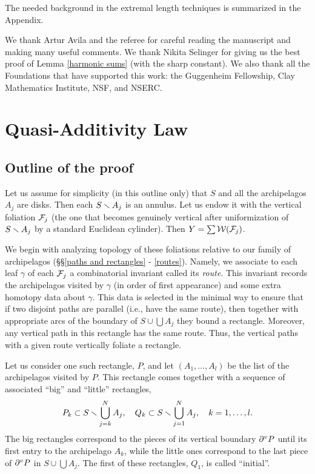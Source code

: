The needed background in the extremal length techniques is summarized in 
the Appendix.   



 We thank Artur Avila and the referee for careful reading the manuscript and making many useful comments.
We  thank Nikita Selinger for giving us the best proof of Lemma \ref{harmonic sums}
(with the sharp constant).
We also thank all the Foundations that have supported this work: 
the Guggenheim Fellowship, Clay Mathematics Institute, NSF, and NSERC. 

\section{Quasi-Additivity Law}\label{quasi-add}


\subsection{Outline of the proof}

   Let us assume for simplicity (in this outline only) that $S$ and all the archipelagos
$A_j$  are  disks. Then each $S\smallsetminus A_j$ is an  annulus. Let us endow it with the vertical foliation
${\cal F}_j$ (the one that becomes genuinely vertical after uniformization of $S\smallsetminus A_j$ by a standard Euclidean
cylinder). Then $Y=\sum {\cal W}({\cal F}_j)$. 

We begin  with analyzing topology of these foliations relative to our
family of archipelagos (\S\S \ref{paths and rectangles} - \ref{routes}). 
Namely, we associate to each leaf $\gamma$ of each ${\cal F}_j$ a combinatorial invariant called its {\it route}. 
This invariant records the archipelagos visited by $\gamma$ (in order of first appearance) 
and some extra homotopy data
about $\gamma$. This data is selected in the minimal way 
to ensure that if two disjoint paths are   parallel (i.e., have the same route), then together
with appropriate arcs of the boundary of $ S\cup \bigcup A_j$ they bound a rectangle.
Moreover, any vertical path in this rectangle has the same route.
Thus, the vertical paths  with a given route vertically foliate a rectangle.

Let us consider one such rectangle, $P$, and let $(A_1,\dots, A_l)$ be the list of the archipelagos
visited by $P$.
This rectangle comes together with a sequence of 
associated ``big'' and ``little'' rectangles,  
$$
   P_k \subset S\smallsetminus \bigcup_{j= k}^N A_j, \quad Q_k \subset S\smallsetminus \bigcup_{j=1}^N A_j, \quad k=1,\dots, l.
$$
The big rectangles correspond to the pieces of its vertical boundary $\partial^v P$ until its first entry to the archipelago
$A_k$, while the little ones correspond to the last piece of $\partial^v P$ in $S\cup \bigcup A_j$.
The first of these rectangles, $Q_1$, is called ``initial''.
 
